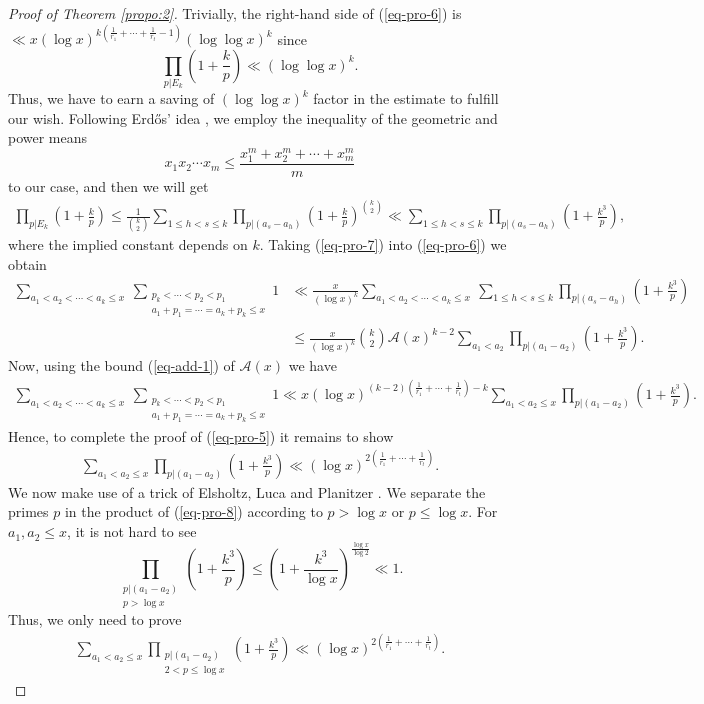 \documentclass[12pt,a4paper,reqno]{amsart}
\numberwithin{equation}{section}
\theoremstyle{plain}
\theoremstyle{definition}
\begin{document}
\begin{proof}[Proof of Theorem \ref{propo:2}]
Trivially, the right-hand side of (\ref{eq-pro-6}) is $\ll x(\log x)^{k\left(\frac{1}{r_1}+\cdots+\frac{1}{r_t}-1\right)}(\log\log x)^k$ since 
$$
\prod_{p|E_k}\left(1+\frac{k}{p}\right)\ll (\log\log x)^k.
$$
Thus, we have to earn a saving of $(\log\log x)^k$ factor in the estimate to fulfill our wish. Following Erd\H os'  idea \cite[Theorem 2]{Erdos2}, we employ the inequality of the geometric and power means 
$$
x_1x_2\cdots x_m\le \frac{x_1^m+x_2^m+\cdots+x_m^m}{m}
$$
to our case, and then we will get
\begin{align}\label{eq-pro-7}
\prod_{p|E_k}\left(1+\frac{k}{p}\right)\le \frac{1}{\binom{k}{2}}\sum_{1\le h<s\le k}\prod_{p|(a_s-a_h)}\left(1+\frac{k}{p}\right)^{\binom{k}{2}}\ll \sum_{1\le h<s\le k}\prod_{p|(a_s-a_h)}\left(1+\frac{k^3}{p}\right),
\end{align}
where the implied constant depends on $k$. Taking (\ref{eq-pro-7}) into (\ref{eq-pro-6}) we obtain
\begin{align*}
\sum_{a_{1}<a_{2}<\cdots<a_{k}\le x}~\sum_{\substack{p_{k}<\cdots<p_{2}<p_{1}\\a_{1}+p_{1}=\cdots=a_{k}+p_{k}\le x}}1&\ll \frac{x}{(\log x)^{k}}\sum_{a_{1}<a_{2}<\cdots<a_{k}\le x}~\sum_{1\le h<s\le k}\prod_{p|(a_s-a_h)}\left(1+\frac{k^3}{p}\right)
\nonumber\\
&\le \frac{x}{(\log x)^{k}}\binom{k}{2}\mathcal{A}(x)^{k-2}\sum_{a_1<a_2}\prod_{p|(a_1-a_2)}\left(1+\frac{k^3}{p}\right).
\end{align*}
Now, using the bound (\ref{eq-add-1}) of $\mathcal{A}(x)$ we have
\begin{align*}
\sum_{a_{1}<a_{2}<\cdots<a_{k}\le x}~\sum_{\substack{p_{k}<\cdots<p_{2}<p_{1}\\a_{1}+p_{1}=\cdots=a_{k}+p_{k}\le x}}1\ll x(\log x)^{(k-2)\left(\frac{1}{r_1}+\cdots+\frac{1}{r_t}\right)-k}\sum_{a_1<a_2\le x}\prod_{p|(a_1-a_2)}\left(1+\frac{k^3}{p}\right).
\end{align*}
Hence, to complete the proof of (\ref{eq-pro-5}) it remains to show
\begin{align*}
\sum_{a_1<a_2\le x}\prod_{p|(a_1-a_2)}\left(1+\frac{k^3}{p}\right)\ll (\log x)^{2\left(\frac{1}{r_1}+\cdots+\frac{1}{r_t}\right)}.
\end{align*}
We now make use of a trick of Elsholtz, Luca and Planitzer \cite{Elsholtz-Luca-Plantizer}. We separate the primes $p$ in the product of (\ref{eq-pro-8}) according to $p>\log x$ or $p\le \log x$. For $a_1,a_2\le x$, it is not hard to see
$$
\prod_{\substack{p|(a_1-a_2)\\ p>\log x}}\left(1+\frac{k^3}{p}\right)\le \left(1+\frac{k^3}{\log x}\right)^{\frac{\log x}{\log 2}}\ll 1.
$$
Thus, we only need to prove
\begin{align}\label{eq-pro-8}
\sum_{a_1<a_2\le x}\prod_{\substack{p|(a_1-a_2)\\2<p\le \log x}}\left(1+\frac{k^3}{p}\right)\ll (\log x)^{2\left(\frac{1}{r_1}+\cdots+\frac{1}{r_t}\right)}.
\end{align}


\end{proof}
\end{document}
